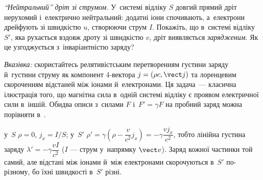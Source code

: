 \begin{problem}\label{prb:NeutralWireParadox}
	\emph{\enquote{Нейтральний} дріт зі струмом.} У~системі відліку $S$ довгий прямий дріт
	нерухомий і~електрично нейтральний: додатні іони спочивають, а~електрони дрейфують зі
	швидкістю $u$, створюючи струм $I$. Покажіть, що в~системі відліку $S'$, яка рухається
	вздовж дроту зі швидкістю $v$, дріт виявляється
	\emph{зарядженим}. Як це узгоджується з~інваріантністю заряду?

	\emph{Вказівка:} скористайтесь релятивістським перетворенням густини заряду й~густини
	струму як компонент 4-вектора $j = (\rho c, \vect j)$ та лоренцевим скороченням
	відстаней між іонами й~електронами. Ця задача~--- класична ілюстрація того, що
	магнітна сила в~одній системі відліку є проявом електричної сили в~іншій. Обидва описи
	з~силами $F$ і~$F'=\gamma F$ на пробний заряд можна порівняти в~.
	\begin{solution}
		у~$S$ $\rho = 0$, $j_x = I/S$; у~$S'$ $\rho' = \gamma\left(\rho - \dfrac{v}{c^2}j_x\right) = -\gamma\dfrac{v j_x}{c^2}$, тобто лінійна густина заряду $\lambda' = -\gamma\dfrac{vI}{c^2}$ ($I$ --- струм у~напрямку $\vect v$). Заряд кожної частинки той самий, але відстані між іонами й~між електронами скорочуються в~$S'$ по-різному, бо їхні швидкості в~$S'$ різні.
	\end{solution}
\end{problem}


